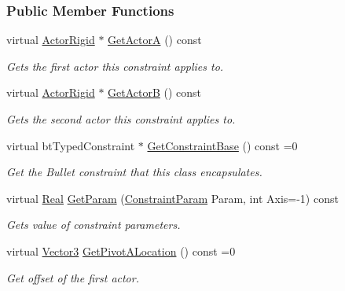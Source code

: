 \subsubsection*{Public Member Functions}
\begin{DoxyCompactItemize}
\item 
virtual \hyperlink{classMezzanine_1_1ActorRigid}{ActorRigid} $\ast$ \hyperlink{classMezzanine_1_1TypedConstraint_a9243a78d94c136d127489b7780ad90d3}{GetActorA} () const 
\begin{DoxyCompactList}\small\item\em Gets the first actor this constraint applies to. \item\end{DoxyCompactList}\item 
virtual \hyperlink{classMezzanine_1_1ActorRigid}{ActorRigid} $\ast$ \hyperlink{classMezzanine_1_1TypedConstraint_a913d8cad2ce92bd3907bc40dc1a5afb8}{GetActorB} () const 
\begin{DoxyCompactList}\small\item\em Gets the second actor this constraint applies to. \item\end{DoxyCompactList}\item 
virtual btTypedConstraint $\ast$ \hyperlink{classMezzanine_1_1TypedConstraint_a7aa13fc4448cf1fc32673bde4ec84767}{GetConstraintBase} () const =0
\begin{DoxyCompactList}\small\item\em Get the Bullet constraint that this class encapsulates. \item\end{DoxyCompactList}\item 
virtual \hyperlink{namespaceMezzanine_a726731b1a7df72bf3583e4a97282c6f6}{Real} \hyperlink{classMezzanine_1_1TypedConstraint_a47138ce9b9cec7af41b3c6fa57985cd5}{GetParam} (\hyperlink{namespaceMezzanine_a6c62e8c2938fb203eb7a7072c12176f4}{ConstraintParam} Param, int Axis=-\/1) const 
\begin{DoxyCompactList}\small\item\em Gets value of constraint parameters. \item\end{DoxyCompactList}\item 
virtual \hyperlink{classMezzanine_1_1Vector3}{Vector3} \hyperlink{classMezzanine_1_1TypedConstraint_af785319e62e274656f180ab80f5f8dd9}{GetPivotALocation} () const =0
\begin{DoxyCompactList}\small\item\em Get offset of the first actor. \item\end{DoxyCompactList}\item 

\end{DoxyCompactItemize}
